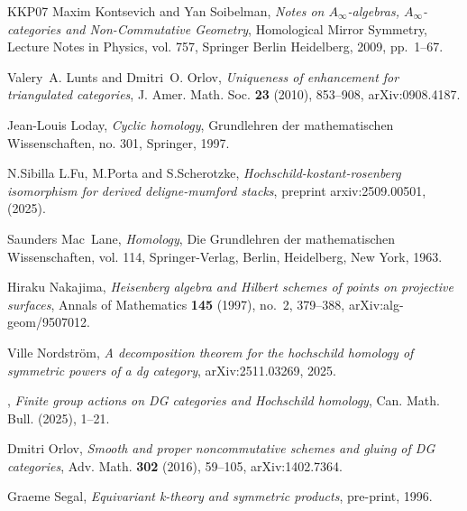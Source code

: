 \documentclass[12pt,a4paper,reqno]{amsart}
\begin{document}
\begin{thebibliography}{KKP07}
Maxim Kontsevich and Yan Soibelman, \emph{Notes on ${A}_\infty$-algebras,
  ${A}_\infty$-categories and {N}on-{C}ommutative {G}eometry}, Homological
  Mirror Symmetry, Lecture Notes in Physics, vol. 757, Springer Berlin
  Heidelberg, 2009, pp.~1--67.

Valery~A. Lunts and Dmitri~O. Orlov, \emph{Uniqueness of enhancement for
  triangulated categories}, J. Amer. Math. Soc. \textbf{23} (2010), 853--908,
  arXiv:0908.4187.

Jean-Louis Loday, \emph{Cyclic homology}, Grundlehren der mathematischen
  {W}issenschaften, no. 301, Springer, 1997.

N.Sibilla L.Fu, M.Porta and S.Scherotzke, \emph{Hochschild-kostant-rosenberg
  isomorphism for derived deligne-mumford stacks}, preprint arxiv:2509.00501,
  (2025).

Saunders Mac~Lane, \emph{Homology}, Die Grundlehren der mathematischen
  Wissenschaften, vol. 114, Springer-Verlag, Berlin, Heidelberg, New York,
  1963.

Hiraku Nakajima, \emph{Heisenberg algebra and {H}ilbert schemes of points on
  projective surfaces}, Annals of Mathematics \textbf{145} (1997), no.~2,
  379--388, arXiv:alg-geom/9507012.

Ville Nordstr{\"o}m, \emph{A decomposition theorem for the hochschild homology
  of symmetric powers of a dg category}, arXiv:2511.03269, 2025.

\bysame, \emph{Finite group actions on {DG} categories and {H}ochschild
  homology}, Can. Math. Bull. (2025), 1--21.

Dmitri Orlov, \emph{Smooth and proper noncommutative schemes and gluing of {DG}
  categories}, Adv. Math. \textbf{302} (2016), 59--105, arXiv:1402.7364.

Graeme Segal, \emph{Equivariant k-theory and symmetric products}, pre-print,
  1996.


\end{thebibliography}
\end{document}

